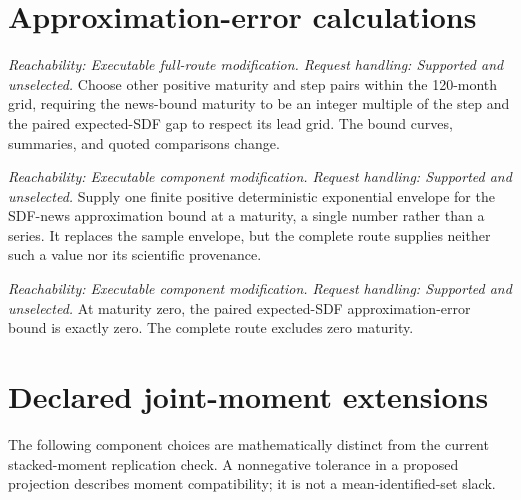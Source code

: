 \documentclass[11pt]{article}
\begin{document}
\section{Approximation-error calculations}

\begin{description}[style=nextline]
\item[Approximation maturities and step.]
\emph{Reachability: Executable full-route modification. Request handling: Supported and unselected.}
Choose other positive maturity and step pairs within the 120-month grid, requiring the news-bound
maturity to be an integer multiple of the step and the paired expected-SDF gap to respect its lead
grid. The bound curves, summaries, and quoted comparisons change.

\item[Deterministic news-bound envelope.]
\emph{Reachability: Executable component modification. Request handling: Supported and unselected.}
Supply one finite positive deterministic exponential envelope for the SDF-news approximation bound
at a maturity, a single number rather than a series. It replaces the sample envelope, but the
complete route supplies neither such a value nor its scientific provenance.

\item[Zero-maturity paired bound.]
\emph{Reachability: Executable component modification. Request handling: Supported and unselected.}
At maturity zero, the paired expected-SDF approximation-error bound is exactly zero. The complete route
excludes zero maturity.
\end{description}

\section{Declared joint-moment extensions}

The following component choices are mathematically distinct from the current stacked-moment
replication check. A nonnegative tolerance in a proposed projection describes moment compatibility;
it is not a mean-identified-set slack.
\end{document}

